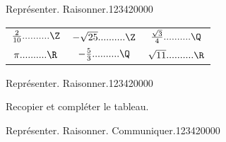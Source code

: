\begin{pageAD}


\begin{ExoCad}{Représenter. Raisonner.}{1234}{2}{0}{0}{0}{0}
 

\begin{tabular}{ccc}

$\frac{2}{10}..........\Z$ & $-\sqrt{25}..........\Z$ & $\frac{\sqrt{3}}{4}..........\Q$ \\ 

$\pi..........\R$  & $-\frac{5}{3}..........\Q$  &  $\sqrt{11}..........\R$ \\ 

\end{tabular} 

\end{ExoCad}


\begin{ExoCad}{Représenter. Raisonner.}{1234}{2}{0}{0}{0}{0}

Recopier et compléter le tableau.


\end{ExoCad}


\begin{ExoCad}{Représenter. Raisonner. Communiquer.}{1234}{2}{0}{0}{0}{0}
 

\end{ExoCad}
\end{pageAD}
